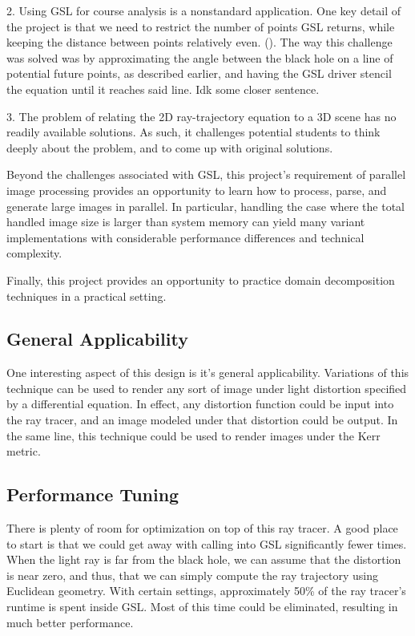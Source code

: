 2. Using GSL for course analysis is a nonstandard application. One key detail of the project is that we need to restrict the number of points GSL returns, while keeping the distance between points relatively even. (). The way this challenge was solved was by approximating the angle between the black hole on a line of potential future points, as described earlier, and having the GSL driver stencil the equation until it reaches said line. Idk some closer sentence.

3. The problem of relating the 2D ray-trajectory equation to a 3D scene has no readily available solutions. As such, it challenges potential students to think deeply about the problem, and to come up with original solutions.

Beyond the challenges associated with GSL, this project's requirement of parallel image processing provides an opportunity to learn how to process, parse, and generate large images in parallel. In particular, handling the case where the total handled image size is larger than system memory can yield many variant implementations with considerable performance differences and technical complexity. 

Finally, this project provides an opportunity to practice domain decomposition techniques in a practical setting.


\subsection{General Applicability}
One interesting aspect of this design is it's general applicability. Variations of this technique can be used to render any sort of image under light distortion specified by a differential equation. In effect, any distortion function could be input into the ray tracer, and an image modeled under that distortion could be output. In the same line, this technique could be used to render images under the Kerr metric.


\subsection{Performance Tuning}
There is plenty of room for optimization on top of this ray tracer. A good place to start is that we could get away with calling into GSL significantly fewer times. When the light ray is far from the black hole, we can assume that the distortion is near zero, and thus, that we can simply compute the ray trajectory using Euclidean geometry. With certain settings, approximately 50\% of the ray tracer's runtime is spent inside GSL. Most of this time could be eliminated, resulting in much better performance. 


